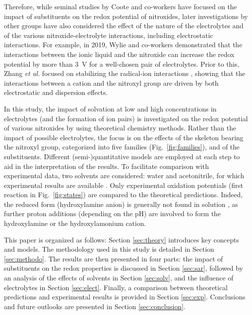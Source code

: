 \documentclass[review,preprint]{elsarticle}
\begin{document}
Therefore, while seminal studies by Coote and co-workers \cite{hodgsonOneElectronOxidationReduction2007,blincoExperimentalTheoreticalStudies2008} have focused on the impact of substituents on the redox potential of nitroxides, later investigations by other groups have also considered the effect of the nature of the electrolytes and of the various nitroxide-electrolyte interactions, including electrostatic interactions. For example, in 2019, Wylie and co-workers \cite{wylieImprovedPerformanceAllOrganic2019a,wylieIncreasedStabilityNitroxide2019b} demonstrated that the interactions between the ionic liquid and the nitroxide can increase the redox potential by more than \SI{3}{\volt} for a well-chosen pair of electrolytes. Prior to this, Zhang \textit{et al.} focused on stabilizing the radical-ion interactions \cite{zhangInteractionsImidazoliumBasedIonic2016,zhangEffectHeteroatomFunctionality2018}, showing that the interactions between a cation and the nitroxyl group are driven by both electrostatic and dispersion effects.

In this study, the impact of solvation at low and high concentrations in electrolytes (and the formation of ion pairs) is investigated on the redox potential of various nitroxides  by using theoretical chemistry methods. Rather than the impact of possible electrolytes, the focus is on the effects of the skeleton bearing the nitroxyl group, categorized into five families (Fig.~\ref{fig:families}), and of the substituents. 
Different (semi-)quantitative models are employed at each step to aid in the interpretation of the results. 
To facilitate comparison with experimental data, two solvents are considered: water and acetonitrile, for which experimental results are available \cite{morrisChemicalElectrochemicalReduction1991,goldsteinStructureActivityRelationship2006,blincoExperimentalTheoreticalStudies2008,zhangEffectHeteroatomFunctionality2018}. Only experimental oxidation potentials (first reaction in  Fig.~\ref{fig:states}) are compared to the theoretical predictions.  Indeed, the reduced form (hydroxylamine anion) is generally not found in solution \cite{israeliKineticsMechanismComproportionation2005}, as further proton additions (depending on the pH) are involved to form the hydroxylamine or the hydroxylamonium cation.

This paper is organized as follows: Section \ref{sec:theory} introduces key concepts and models. The methodology used in this study is detailed in Section \ref{sec:methodo}. The results are then presented in four parts: the impact of substituents on the redox properties is discussed in Section \ref{sec:sar}, followed by an analysis of the effects of solvents in Section \ref{sec:solv}, and the influence of electrolytes in Section \ref{sec:elect}. Finally, a comparison between theoretical predictions and experimental results is provided in Section \ref{sec:exp}. Conclusions and future outlooks are presented in Section \ref{sec:conclusion}.
\end{document}

